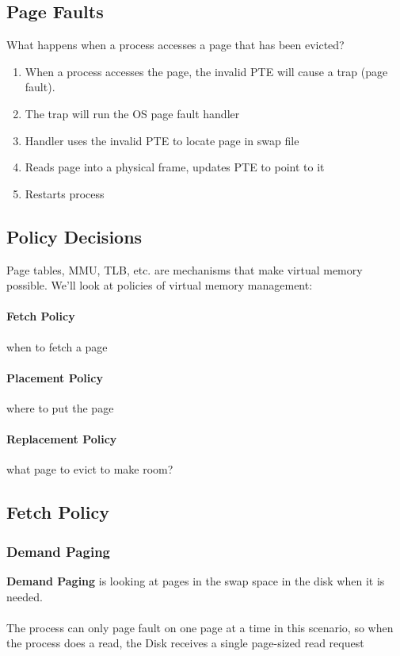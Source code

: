 \documentclass{article}
\begin{document}
\subsection{Page Faults}

What happens when a process accesses a page that has been evicted?

\begin{enumerate}
    \item When a process accesses the page, the invalid PTE will cause a trap (page fault).
    \item The trap will run the OS page fault handler
    \item Handler uses the invalid PTE to locate page in swap file
    \item Reads page into a physical frame, updates PTE to point to it
    \item Restarts process
\end{enumerate}

\subsection{Policy Decisions}

Page tables, MMU, TLB, etc. are mechanisms that make virtual memory possible. We'll look at policies of virtual memory management:

\paragraph{Fetch Policy} when to fetch a page
\paragraph{Placement Policy} where to put the page
\paragraph{Replacement Policy} what page to evict to make room?

\subsection{Fetch Policy}

\subsubsection{Demand Paging}
\textbf{Demand Paging} is looking at pages in the swap space in the disk when it is needed.\\
\\
The process can only page fault on one page at a time in this scenario, so when the process does a read, the Disk receives a single page-sized read request
\end{document}
